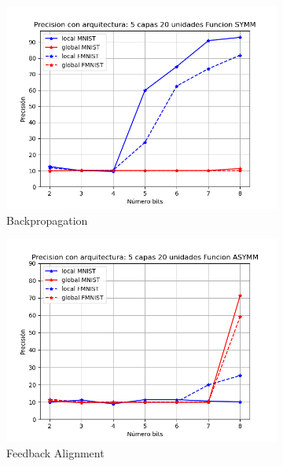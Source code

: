 \begin{figure}[H]
    \centering
    \begin{subfigure}[H]{0.475\textwidth}
    \includegraphics[width=\textwidth]{imagenes/backprop/Precision con arquitectura: 5 capas 20 unidades Funcion SYMM.png}
    \caption{Backpropagation}
    \end{subfigure}
    \begin{subfigure}[H]{0.475\textwidth}
    \includegraphics[width=\textwidth]{imagenes/fa/Precision con arquitectura: 5 capas 20 unidades Funcion ASYMM.png}
    \caption{Feedback Alignment}
    \end{subfigure}
    \begin{subfigure}[H]{0.475\textwidth}

\end{subfigure}
\end{figure}

